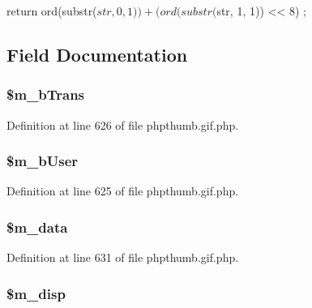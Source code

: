 \begin{DoxyCode}
        {
                return ord(substr($str, 0, 1)) + (ord(substr($str, 1, 1)) << 8)
      ;
        }
\end{DoxyCode}


\subsection{\-Field \-Documentation}
\hypertarget{class_c_g_i_f_i_m_a_g_e_ac59a3a6cbefe5e88bb2fb75b3d262130}{
\subsubsection[{\$m\-\_\-b\-Trans}]{\setlength{\rightskip}{0pt plus 5cm}\$m\-\_\-b\-Trans}}\label{class_c_g_i_f_i_m_a_g_e_ac59a3a6cbefe5e88bb2fb75b3d262130}


\-Definition at line 626 of file phpthumb.\-gif.\-php.

\hypertarget{class_c_g_i_f_i_m_a_g_e_a9bf034a04ebeb5e5e362aaa5acf364de}{
\subsubsection[{\$m\-\_\-b\-User}]{\setlength{\rightskip}{0pt plus 5cm}\$m\-\_\-b\-User}}\label{class_c_g_i_f_i_m_a_g_e_a9bf034a04ebeb5e5e362aaa5acf364de}


\-Definition at line 625 of file phpthumb.\-gif.\-php.

\hypertarget{class_c_g_i_f_i_m_a_g_e_ab8f933493a79963aece23fd98ae1cbeb}{
\subsubsection[{\$m\-\_\-data}]{\setlength{\rightskip}{0pt plus 5cm}\$m\-\_\-data}}\label{class_c_g_i_f_i_m_a_g_e_ab8f933493a79963aece23fd98ae1cbeb}


\-Definition at line 631 of file phpthumb.\-gif.\-php.

\hypertarget{class_c_g_i_f_i_m_a_g_e_af1f750bf7a08cca91e6b59c057c151ed}{
\subsubsection[{\$m\-\_\-disp}]{\setlength{\rightskip}{0pt plus 5cm}\$m\-\_\-disp}}\label{class_c_g_i_f_i_m_a_g_e_af1f750bf7a08cca91e6b59c057c151ed}


